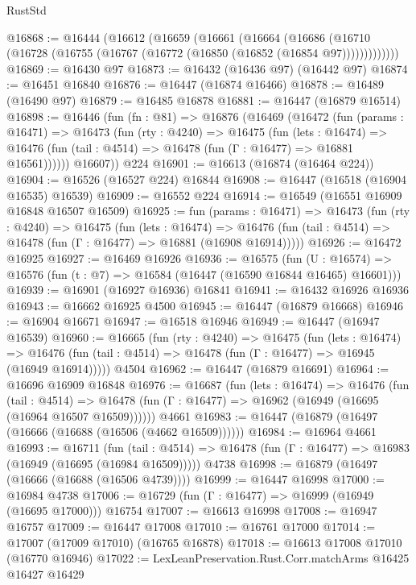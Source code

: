 \begin{lexlean}{RustStd}
\begin{coremodule}
{\begin{coremodule}
{{{{{{{{{{{{{{{{{{{{{{{{{{{{{{{{{{{{{{{{{{{{{{{{{{{{{{{@16868 := @16444
    (@16612
      (@16659
        (@16661
          (@16664
            (@16686 (@16710 (@16728 (@16755 (@16767 (@16772 (@16850 (@16852 (@16854 @97)))))))))))))
@16869 := @16430 @97
@16873 := @16432 (@16436 @97) (@16442 @97)
@16874 := @16451 @16840
@16876 := @16447 (@16874 @16466)
@16878 := @16489 (@16490 @97)
@16879 := @16485 @16878
@16881 := @16447 (@16879 @16514)
@16898 := @16446
    (fun (fn : @81) =>
    @16876
      (@16469
        (@16472
          (fun (params : @16471) =>
          @16473
            (fun (rty : @4240) =>
            @16475
              (fun (lets : @16474) =>
              @16476 (fun (tail : @4514) => @16478 (fun (Γ : @16477) => @16881 @16561))))))
        @16607))
    @224
@16901 := @16613 (@16874 (@16464 @224))
@16904 := @16526 (@16527 @224) @16844
@16908 := @16447 (@16518 (@16904 @16535) @16539)
@16909 := @16552 @224
@16914 := @16549 (@16551 @16909 @16848 @16507 @16509)
@16925 := fun (params : @16471) =>
  @16473
    (fun (rty : @4240) =>
    @16475
      (fun (lets : @16474) =>
      @16476 (fun (tail : @4514) => @16478 (fun (Γ : @16477) => @16881 (@16908 @16914)))))
@16926 := @16472 @16925
@16927 := @16469 @16926
@16936 := @16575
    (fun (U : @16574) => @16576 (fun (t : @7) => @16584 (@16447 (@16590 @16844 @16465) @16601)))
@16939 := @16901 (@16927 @16936) @16841
@16941 := @16432 @16926 @16936
@16943 := @16662 @16925 @4500
@16945 := @16447 (@16879 @16668)
@16946 := @16904 @16671
@16947 := @16518 @16946
@16949 := @16447 (@16947 @16539)
@16960 := @16665
    (fun (rty : @4240) =>
    @16475
      (fun (lets : @16474) =>
      @16476 (fun (tail : @4514) => @16478 (fun (Γ : @16477) => @16945 (@16949 @16914)))))
    @4504
@16962 := @16447 (@16879 @16691)
@16964 := @16696 @16909 @16848
@16976 := @16687
    (fun (lets : @16474) =>
    @16476
      (fun (tail : @4514) =>
      @16478 (fun (Γ : @16477) => @16962 (@16949 (@16695 (@16964 @16507 @16509))))))
    @4661
@16983 := @16447 (@16879 (@16497 (@16666 (@16688 (@16506 (@4662 @16509))))))
@16984 := @16964 @4661
@16993 := @16711
    (fun (tail : @4514) => @16478 (fun (Γ : @16477) => @16983 (@16949 (@16695 (@16984 @16509)))))
    @4738
@16998 := @16879 (@16497 (@16666 (@16688 (@16506 @4739))))
@16999 := @16447 @16998
@17000 := @16984 @4738
@17006 := @16729 (fun (Γ : @16477) => @16999 (@16949 (@16695 @17000))) @16754
@17007 := @16613 @16998
@17008 := @16947 @16757
@17009 := @16447 @17008
@17010 := @16761 @17000
@17014 := @17007 (@17009 @17010) (@16765 @16878)
@17018 := @16613 @17008 @17010 (@16770 @16946)
@17022 := LexLeanPreservation.Rust.Corr.matchArms @16425 @16427 @16429
}}}}}}}}}}}}}}}}}}}}}}}}}}}}}}}}}}}}}}}}}}}}}}}}}}}}}}}
\end{coremodule}}
\end{coremodule}
\end{lexlean}
